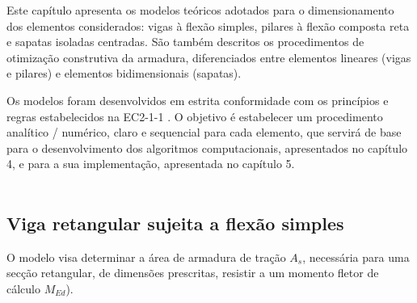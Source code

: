 
Este capítulo apresenta os modelos teóricos adotados para o dimensionamento dos elementos considerados: vigas à flexão simples, pilares à flexão composta reta e sapatas isoladas centradas. 
São também descritos os procedimentos de otimização construtiva da armadura, diferenciados entre elementos lineares (vigas e pilares) e elementos bidimensionais (sapatas).


Os modelos foram desenvolvidos em estrita conformidade com os princípios e regras estabelecidos na EC2-1-1 \cite{EN1992,CachimBases,Appleton}. 
O objetivo é estabelecer um procedimento analítico / numérico, claro e sequencial para cada elemento, que servirá de base para o desenvolvimento dos algoritmos computacionais, 
apresentados no capítulo 4, e para a sua implementação, apresentada no capítulo 5.\\\\


\subsection{Viga retangular sujeita a flexão simples}
O modelo visa determinar a área de armadura de tração $A_s$, necessária para uma secção retangular, de dimensões prescritas, resistir a um momento fletor de cálculo $M_{Ed}$).

